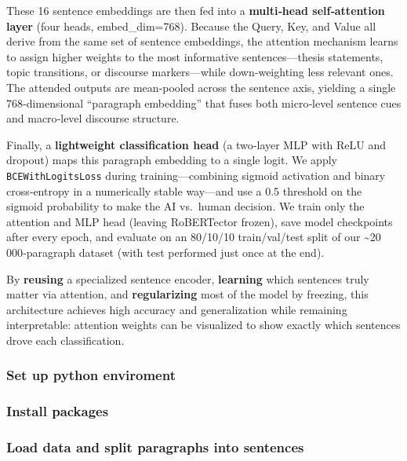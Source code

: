 \documentclass[
]{article}
\begin{document}
These 16 sentence embeddings are then fed into a \textbf{multi‑head
self‑attention layer} (four heads, embed\_dim=768). Because the Query,
Key, and Value all derive from the same set of sentence embeddings, the
attention mechanism learns to assign higher weights to the most
informative sentences---thesis statements, topic transitions, or
discourse markers---while down‑weighting less relevant ones. The
attended outputs are mean‑pooled across the sentence axis, yielding a
single 768‑dimensional ``paragraph embedding'' that fuses both
micro‑level sentence cues and macro‑level discourse structure.

Finally, a \textbf{lightweight classification head} (a two‑layer MLP
with ReLU and dropout) maps this paragraph embedding to a single logit.
We apply \texttt{BCEWithLogitsLoss} during training---combining sigmoid
activation and binary cross‑entropy in a numerically stable way---and
use a 0.5 threshold on the sigmoid probability to make the AI vs.~human
decision. We train only the attention and MLP head (leaving RoBERTector
frozen), save model checkpoints after every epoch, and evaluate on an
80/10/10 train/val/test split of our \textasciitilde20\,000‑paragraph
dataset (with test performed just once at the end).

By \textbf{reusing} a specialized sentence encoder, \textbf{learning}
which sentences truly matter via attention, and \textbf{regularizing}
most of the model by freezing, this architecture achieves high accuracy
and generalization while remaining interpretable: attention weights can
be visualized to show exactly which sentences drove each classification.

\subsubsection{Set up python enviroment}\label{set-up-python-enviroment}

\subsubsection{Install packages}\label{install-packages}

\subsubsection{Load data and split paragraphs into
sentences}\label{load-data-and-split-paragraphs-into-sentences}
\end{document}
